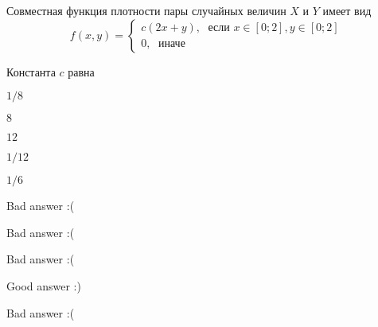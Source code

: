 
\begin{question}
Совместная функция плотности пары случайных величин \(X\) и \(Y\) имеет
вид \[
f(x,y)=\begin{cases}
c (2x+y), \; \text{ если } x\in[0;2], y\in [0;2] \\
0, \; \text{ иначе}
\end{cases}
\]

Константа \(c\) равна
\begin{answerlist}
  \item \(1/8\)
  \item \(8\)
  \item \(12\)
  \item \(1/12\)
  \item \(1/6\)
\end{answerlist}
\end{question}

\begin{solution}
\begin{answerlist}
  \item Bad answer :(
  \item Bad answer :(
  \item Bad answer :(
  \item Good answer :)
  \item Bad answer :(
\end{answerlist}
\end{solution}

